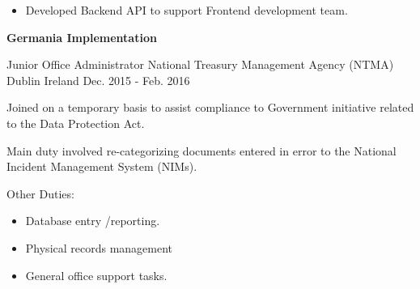 \begin{cventries}
{\begin{cvitems}
{\begin{itemize}
		       \item {Developed Backend API to support Frontend development team.}{~\vskip 0.05in}
         \end{itemize}}
      {\textbf{Germania Implementation}\hfill{}
      }      
    \end{cvitems}
    }
  \cventry
    {Junior Office Administrator} %
    {National Treasury Management Agency (NTMA)} %
    {Dublin Ireland} %
    {Dec. 2015 - Feb. 2016} %
    {
      \begin{cvitems} %
        \item {Joined on a temporary basis to assist compliance to Government initiative related to the Data Protection Act.}
        \item {Main duty involved re-categorizing documents entered in error to the National Incident Management System (NIMs).}
        \item {Other Duties:
        	\begin{itemize}
        		\item {Database entry /reporting.}
			    	\item {Physical records management}
				    \item {General office support tasks.}
		    	\end{itemize}
			}
      \end{cvitems}
    }
\end{cventries}
